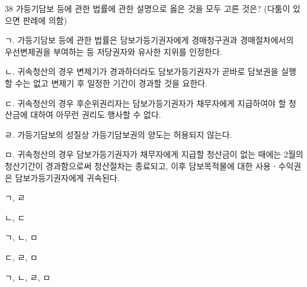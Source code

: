 \begin{question}{38}
가등기담보 등에 관한 법률에 관한 설명으로 옳은 것을 모두 고른 것은? (다툼이 있으면 판례에 의함)
\begin{framedtext}
ㄱ. 가등기담보 등에 관한 법률은 담보가등기권자에게 경매청구권과 경매절차에서의 우선변제권을 부여하는 등 저당권자와 유사한 지위를 인정한다. \par
ㄴ. 귀속청산의 경우 변제기가 경과하더라도 담보가등기권자가 곧바로 담보권을 실행할 수는 없고 변제기 후 일정한 기간이 경과할 것을 요한다. \par
ㄷ. 귀속청산의 경우 후순위권리자는 담보가등기권자가 채무자에게 지급하여야 할 청산금에 대하여 아무런 권리도 행사할 수 없다. \par
ㄹ. 가등기담보의 성질상 가등기담보권의 양도는 허용되지 않는다. \par
ㅁ. 귀속청산의 경우 담보가등기권자가 채무자에게 지급할 청산금이 없는 때에는 2월의 청산기간이 경과함으로써 청산절차는 종료되고, 이후 담보목적물에 대한 사용ㆍ수익권은 담보가등기권자에게 귀속된다. \par
\end{framedtext}
\begin{choices}
  \item ㄱ, ㄹ
  \item ㄴ, ㄷ
  \item ㄱ, ㄴ, ㅁ
  \item ㄷ, ㄹ, ㅁ
  \item ㄱ, ㄴ, ㄹ, ㅁ
\end{choices}
\end{question}
